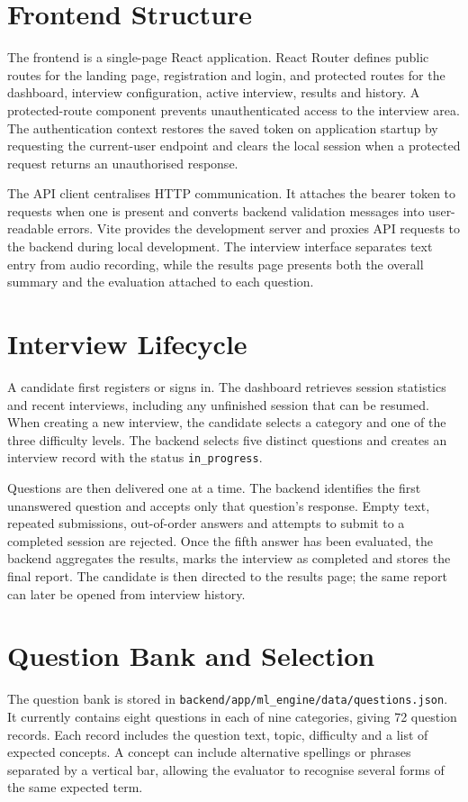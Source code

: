 \documentclass[12pt,a4paper,oneside]{report}
\begin{document}
\section{Frontend Structure}
The frontend is a single-page React application. React Router defines public routes for the landing page, registration and login, and protected routes for the dashboard, interview configuration, active interview, results and history. A protected-route component prevents unauthenticated access to the interview area. The authentication context restores the saved token on application startup by requesting the current-user endpoint and clears the local session when a protected request returns an unauthorised response.

The API client centralises HTTP communication. It attaches the bearer token to requests when one is present and converts backend validation messages into user-readable errors. Vite provides the development server and proxies API requests to the backend during local development. The interview interface separates text entry from audio recording, while the results page presents both the overall summary and the evaluation attached to each question.

\section{Interview Lifecycle}
A candidate first registers or signs in. The dashboard retrieves session statistics and recent interviews, including any unfinished session that can be resumed. When creating a new interview, the candidate selects a category and one of the three difficulty levels. The backend selects five distinct questions and creates an interview record with the status \texttt{in\_progress}.

Questions are then delivered one at a time. The backend identifies the first unanswered question and accepts only that question's response. Empty text, repeated submissions, out-of-order answers and attempts to submit to a completed session are rejected. Once the fifth answer has been evaluated, the backend aggregates the results, marks the interview as completed and stores the final report. The candidate is then directed to the results page; the same report can later be opened from interview history.

\section{Question Bank and Selection}
The question bank is stored in \texttt{backend/app/ml\_engine/data/questions.json}. It currently contains eight questions in each of nine categories, giving 72 question records. Each record includes the question text, topic, difficulty and a list of expected concepts. A concept can include alternative spellings or phrases separated by a vertical bar, allowing the evaluator to recognise several forms of the same expected term.
\end{document}
